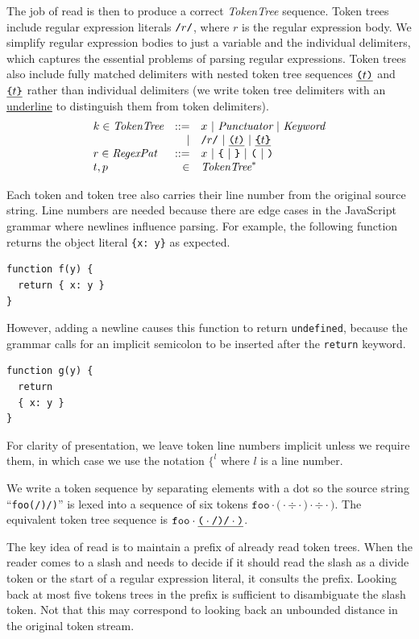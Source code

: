 \documentclass[preprint,10pt]{sigplanconf}
\begin{document}
The job of read is then to produce a correct \textit{TokenTree} sequence. Token trees include regular expression literals $\texttt{/}r\texttt{/}$, where $r$ is the regular expression body. We simplify regular expression bodies to just a variable and the individual delimiters, which captures the essential problems of parsing regular expressions.
Token trees also include fully matched delimiters with nested token tree sequences $\underline{ \texttt{(} t \texttt{)}}$ and $\underline{ \texttt{\{} t \texttt{\}} }$ rather than individual delimiters (we write token tree delimiters with an \underline{underline} to distinguish them from token delimiters).
\[
\begin{array}{lrl}
  k \in \textit{TokenTree} &::=& x ~|~ \textit{Punctuator} ~|~ \textit{Keyword}
  \\
  &|& \texttt{/}r\texttt{/} ~|~ \underline{ \texttt{(} t \texttt{)}} ~|~ \underline{ \texttt{\{} t \texttt{\}} }
  \\
  r \in \textit{RegexPat} &::=& x ~|~ \texttt{\{} ~|~ \texttt{\}}
  ~|~ \texttt{(} ~|~ \texttt{)}
  \\
  t,p &\in& \textit{TokenTree}^{*}
\end{array}
\]

Each token and token tree also carries their line number from the original source string. Line numbers are needed because there are edge cases in the JavaScript grammar 
where newlines influence parsing.
For example,
the following function returns the object literal \verb!{x: y}! as expected. 
\begin{lstlisting}
function f(y) {
  return { x: y }
}
\end{lstlisting}
However, adding a newline causes this function to 
return \verb!undefined!, because the grammar calls for an implicit semicolon to be inserted after the \verb!return! keyword.
\begin{lstlisting}
function g(y) {
  return 
  { x: y }
}
\end{lstlisting}
For clarity of presentation, we leave token line numbers implicit unless we require them, in which case we use the notation $\texttt{\{}^l$ where $l$ is a line number.

We write a token sequence by separating elements with a dot so
the source string ``\texttt{foo(/)/)}'' 
is lexed into a sequence
of six tokens \( \texttt{foo}\cdot \texttt{(} \cdot \div \cdot \texttt{)}
\cdot \div \cdot \texttt{)} \). The equivalent token tree sequence is
\(
\texttt{foo} \cdot \underline{ \texttt{(} \cdot \texttt{/} \texttt{)} \texttt{/} \cdot  \texttt{)}}
\).


The key idea of read is to maintain a prefix of already read token
trees. When the reader comes to a slash and needs to decide if it
should read the slash as a divide token or the start of a regular
expression literal, it consults the prefix. Looking back at most five
tokens trees in the prefix is sufficient to disambiguate the slash
token. Not that this may correspond to looking back an unbounded
distance in the original token stream.
\end{document}

